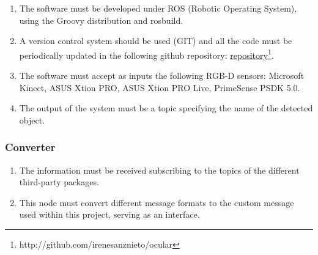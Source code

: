 \begin{enumerate}[label=\textbf{FR\threedigits*}, leftmargin=2cm]

	\item The software must be developed under ROS (Robotic Operating System), using the Groovy distribution and rosbuild.
	\item A version control system should be used (GIT) and all the code must be periodically updated in the following github repository: \href{http://github.com/irenesanznieto/ocular}{\color{blue}\underline {repository}}\footnote{http://github.com/irenesanznieto/ocular}. 

	\item The software must accept as inputs the following RGB-D sensors: Microsoft Kinect, ASUS Xtion PRO, ASUS Xtion PRO Live, PrimeSense PSDK 5.0.
	\item The output of the system must be a topic specifying the name of the detected object. 
   \setcounter{saveenum}{\value{enumi}}
\end{enumerate}
 
\subsubsection{Converter} 
\begin{enumerate}[label=\textbf{FR\threedigits*}, leftmargin=2cm]
  \setcounter{enumi}{\value{saveenum}}
\item The information must be received subscribing to the topics of the different third-party packages. 
\item This node must convert different message formats to the custom message used within this project, serving as an interface. 
   \setcounter{saveenum}{\value{enumi}}
\end{enumerate}

